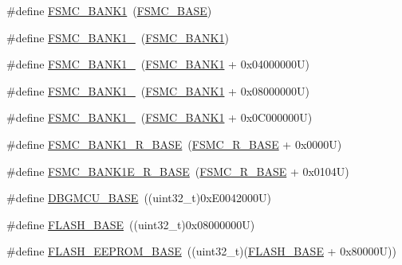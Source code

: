 \begin{DoxyCompactItemize}
\item 
\#define \hyperlink{group___peripheral__memory__map_gad9f1205bd4a5a87047167cfd08c621be}{F\-S\-M\-C\-\_\-\-B\-A\-N\-K1}~(\hyperlink{group___peripheral__memory__map_ga679200df61ecb0695d72c030fdeb50a9}{F\-S\-M\-C\-\_\-\-B\-A\-S\-E})
\item 
\#define \hyperlink{group___peripheral__memory__map_gab711931ab21fd2a4f74a673d5256e113}{F\-S\-M\-C\-\_\-\-B\-A\-N\-K1\-\_}~(\hyperlink{group___peripheral__memory__map_gad9f1205bd4a5a87047167cfd08c621be}{F\-S\-M\-C\-\_\-\-B\-A\-N\-K1})
\item 
\#define \hyperlink{group___peripheral__memory__map_gadc659d72d6ff27f3b37b1acaa430655e}{F\-S\-M\-C\-\_\-\-B\-A\-N\-K1\-\_}~(\hyperlink{group___peripheral__memory__map_gad9f1205bd4a5a87047167cfd08c621be}{F\-S\-M\-C\-\_\-\-B\-A\-N\-K1} + 0x04000000\-U)
\item 
\#define \hyperlink{group___peripheral__memory__map_ga53c3a83da3ccbaf54880dde30df549e7}{F\-S\-M\-C\-\_\-\-B\-A\-N\-K1\-\_}~(\hyperlink{group___peripheral__memory__map_gad9f1205bd4a5a87047167cfd08c621be}{F\-S\-M\-C\-\_\-\-B\-A\-N\-K1} + 0x08000000\-U)
\item 
\#define \hyperlink{group___peripheral__memory__map_ga4fe30cb75e7817aa7a1799ec5c18c842}{F\-S\-M\-C\-\_\-\-B\-A\-N\-K1\-\_}~(\hyperlink{group___peripheral__memory__map_gad9f1205bd4a5a87047167cfd08c621be}{F\-S\-M\-C\-\_\-\-B\-A\-N\-K1} + 0x0\-C000000\-U)
\item 
\#define \hyperlink{group___peripheral__memory__map_ga48d8f80d608b64cb42e7ed223066f856}{F\-S\-M\-C\-\_\-\-B\-A\-N\-K1\-\_\-\-R\-\_\-\-B\-A\-S\-E}~(\hyperlink{group___peripheral__memory__map_gaddf0e199dccba83272b20c9fb4d3aaed}{F\-S\-M\-C\-\_\-\-R\-\_\-\-B\-A\-S\-E} + 0x0000\-U)
\item 
\#define \hyperlink{group___peripheral__memory__map_gaa2ebab683a214fe3b0c628228bff3724}{F\-S\-M\-C\-\_\-\-B\-A\-N\-K1\-E\-\_\-\-R\-\_\-\-B\-A\-S\-E}~(\hyperlink{group___peripheral__memory__map_gaddf0e199dccba83272b20c9fb4d3aaed}{F\-S\-M\-C\-\_\-\-R\-\_\-\-B\-A\-S\-E} + 0x0104\-U)
\item 
\#define \hyperlink{group___peripheral__memory__map_ga4adaf4fd82ccc3a538f1f27a70cdbbef}{D\-B\-G\-M\-C\-U\-\_\-\-B\-A\-S\-E}~((uint32\-\_\-t)0x\-E0042000\-U)
\item 
\#define \hyperlink{group___peripheral__memory__map_ga23a9099a5f8fc9c6e253c0eecb2be8db}{F\-L\-A\-S\-H\-\_\-\-B\-A\-S\-E}~((uint32\-\_\-t)0x08000000\-U)
\item 
\#define \hyperlink{group___peripheral__memory__map_ga45b9071c81cb72a66e2e3195343fcb3a}{F\-L\-A\-S\-H\-\_\-\-E\-E\-P\-R\-O\-M\-\_\-\-B\-A\-S\-E}~((uint32\-\_\-t)(\hyperlink{group___peripheral__memory__map_ga23a9099a5f8fc9c6e253c0eecb2be8db}{F\-L\-A\-S\-H\-\_\-\-B\-A\-S\-E} + 0x80000\-U))

\end{DoxyCompactItemize}
